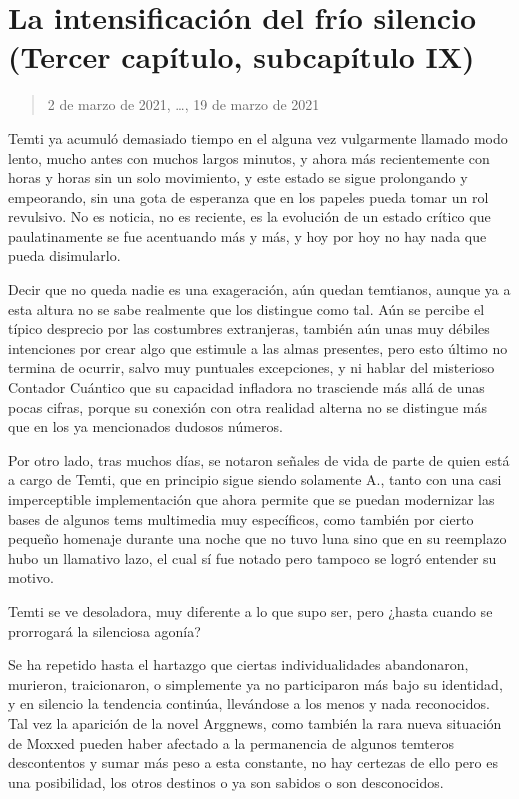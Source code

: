 \documentclass[
  spanish,
]{book}
\begin{document}
\hypertarget{la-intensificaciuxf3n-del-fruxedo-silencio-tercer-capuxedtulo-subcapuxedtulo-ix}{%
\section{La intensificación del frío silencio (Tercer capítulo, subcapítulo IX)}\label{la-intensificaciuxf3n-del-fruxedo-silencio-tercer-capuxedtulo-subcapuxedtulo-ix}}

\begin{quote}
2 de marzo de 2021, \ldots, 19 de marzo de 2021
\end{quote}

Temti ya acumuló demasiado tiempo en el alguna vez vulgarmente llamado modo lento, mucho antes con muchos largos minutos, y ahora más recientemente con horas y horas sin un solo movimiento, y este estado se sigue prolongando y empeorando, sin una gota de esperanza que en los papeles pueda tomar un rol revulsivo. No es noticia, no es reciente, es la evolución de un estado crítico que paulatinamente se fue acentuando más y más, y hoy por hoy no hay nada que pueda disimularlo.

Decir que no queda nadie es una exageración, aún quedan temtianos, aunque ya a esta altura no se sabe realmente que los distingue como tal. Aún se percibe el típico desprecio por las costumbres extranjeras, también aún unas muy débiles intenciones por crear algo que estimule a las almas presentes, pero esto último no termina de ocurrir, salvo muy puntuales excepciones, y ni hablar del misterioso Contador Cuántico que su capacidad infladora no trasciende más allá de unas pocas cifras, porque su conexión con otra realidad alterna no se distingue más que en los ya mencionados dudosos números.

Por otro lado, tras muchos días, se notaron señales de vida de parte de quien está a cargo de Temti, que en principio sigue siendo solamente A., tanto con una casi imperceptible implementación que ahora permite que se puedan modernizar las bases de algunos tems multimedia muy específicos, como también por cierto pequeño homenaje durante una noche que no tuvo luna sino que en su reemplazo hubo un llamativo lazo, el cual sí fue notado pero tampoco se logró entender su motivo.

Temti se ve desoladora, muy diferente a lo que supo ser, pero ¿hasta cuando se prorrogará la silenciosa agonía?

Se ha repetido hasta el hartazgo que ciertas individualidades abandonaron, murieron, traicionaron, o simplemente ya no participaron más bajo su identidad, y en silencio la tendencia continúa, llevándose a los menos y nada reconocidos.
Tal vez la aparición de la novel Arggnews, como también la rara nueva situación de Moxxed pueden haber afectado a la permanencia de algunos temteros descontentos y sumar más peso a esta constante, no hay certezas de ello pero es una posibilidad, los otros destinos o ya son sabidos o son desconocidos.
\end{document}
